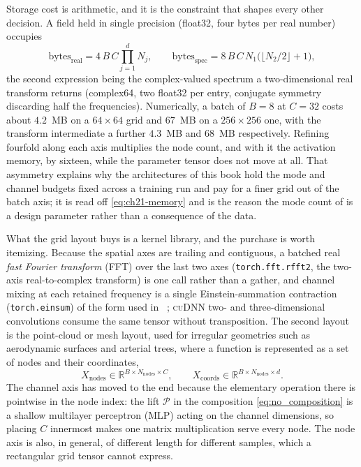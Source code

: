Storage cost is arithmetic, and it is the constraint that shapes every other decision.
A field held in single precision (float32, four bytes per real number) occupies
\begin{equation}
  \label{eq:ch21-memory}
  \mathrm{bytes}_{\mathrm{real}} = 4\, B\, C \prod_{j=1}^{d} N_j,
  \qquad
  \mathrm{bytes}_{\mathrm{spec}} = 8\, B\, C\, N_1 \big(\lfloor N_2/2 \rfloor + 1\big),
\end{equation}
the second expression being the complex-valued spectrum a two-dimensional real transform
returns (complex64, two float32 per entry, conjugate symmetry discarding half the
frequencies). Numerically, a batch of $B = 8$ at $C = 32$ costs about $4.2$~MB on a
$64 \times 64$ grid and $67$~MB on a $256 \times 256$ one, with the transform
intermediate a further $4.3$~MB and $68$~MB respectively. Refining fourfold along each
axis multiplies the node count, and with it the activation memory, by sixteen, while the
parameter tensor does not move at all.
That asymmetry explains why the architectures of this book hold the mode and channel
budgets fixed across a training run and pay for a finer grid out of the batch axis; it is
read off \eqref{eq:ch21-memory} and is the reason the mode count of
 is a design parameter
rather than a consequence of the data.

What the grid layout buys is a kernel library, and the purchase is worth itemizing.
Because the spatial axes are trailing and contiguous, a batched real \emph{fast Fourier
transform} (FFT) over the last two axes (\texttt{torch.fft.rfft2}, the two-axis
real-to-complex transform) is one call rather
than a gather, and channel mixing at each retained frequency is a single Einstein-summation
contraction (\texttt{torch.einsum}) of the form used in
~\cite{li2021fourier};
\textsc{cuDNN} two- and
three-dimensional convolutions consume the same tensor without transposition.
The second layout is the point-cloud or mesh layout, used for irregular geometries such
as aerodynamic surfaces and arterial trees, where a function is represented as a set of
nodes and their coordinates,
\begin{equation}
  \label{eq:ch21-node-layout}
  X_{\text{nodes}} \in \mathbb{R}^{B \times N_{\text{nodes}} \times C}, \qquad
  X_{\text{coords}} \in \mathbb{R}^{B \times N_{\text{nodes}} \times d}.
\end{equation}
The channel axis has moved to the end because the elementary operation there is pointwise
in the node index: the lift $\mathcal{P}$ in the composition \eqref{eq:no_composition} is
a shallow multilayer perceptron (MLP) acting on the channel dimensions, so placing $C$
innermost makes one matrix multiplication serve every node. The node axis is
also, in general, of different length for different samples, which a rectangular grid
tensor cannot express.

